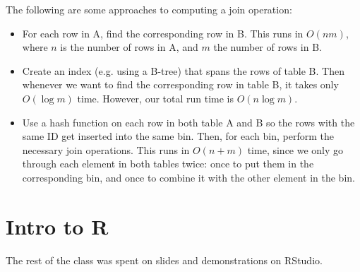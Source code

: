 The following are some approaches to computing a join operation:
\begin{itemize}
  \item For each row in A, find the corresponding row in B. This runs in $O(nm)$, where $n$ is the number of rows in A, and $m$ the number of rows in B.
  \item Create an index (e.g. using a B-tree) that spans the rows of table B. Then whenever we want to find the corresponding row in table B, it takes only $O(\log m)$ time. However, our total run time is $O(n\log m)$.
  \item Use a hash function on each row in both table A and B so the rows with the same ID get inserted into the same bin. Then, for each bin, perform the necessary join operations. This runs in $O(n + m)$ time, since we only go through each element in both tables twice: once to put them in the corresponding bin, and once to combine it with the other element in the bin.
\end{itemize}

\section{Intro to R}
The rest of the class was spent on slides and demonstrations on RStudio. 
